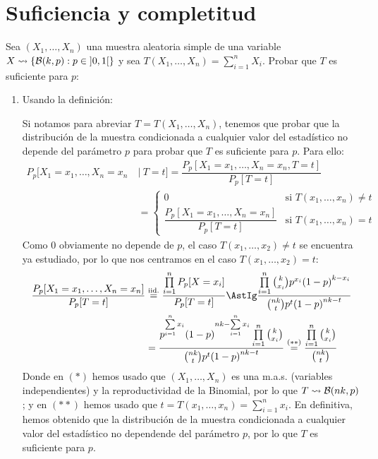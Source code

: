 \section{Suficiencia y completitud}

\begin{ejercicio}
    Sea $(X_1, \ldots, X_n)$ una muestra aleatoria simple de una variable $X\rightsquigarrow\{\mathcal{B}(k,p) : p\in \left]0,1\right[\}$ y sea $T(X_1, \ldots, X_n) = \sum\limits_{i=1}^n X_i$. Probar que $T$ es suficiente para $p$:
    \begin{enumerate}
        \item Usando la definición:
        
        Si notamos para abreviar $T=T(X_1, \ldots, X_n)$, tenemos que probar que la distribución de la muestra condicionada a cualquier valor del estadístico no depende del parámetro $p$ para probar que $T$ es suficiente para $p$. Para ello:
        \begin{align*}
            P_p[X_1 = x_1, \ldots, X_n = x_n \ &|\ T=t] = \dfrac{P_p[X_1=x_1, \ldots, X_n = x_n, T=t]}{P_p[T=t]} \\
                                                        &= \left\{\begin{array}{ll}
                                                            0 & \text{si\ } T(x_1,\ldots,x_n)\neq t \\
                                                            \dfrac{P_p[X_1=x_1, \ldots, X_n=x_n]}{P_p[T=t]}& \text{si\ } T(x_1,\ldots,x_n) = t
                                                        \end{array}\right. 
        \end{align*}
        Como $0$ obviamente no depende de $p$, el caso $T(x_1,\ldots,x_2)\neq t$ se encuentra ya estudiado, por lo que nos centramos en el caso $T(x_1,\ldots,x_2)=t$:
        \begin{align*}
            \dfrac{P_p[X_1=x_1, \ldots, X_n = x_n]}{P_p[T=t]} &\stackrel{\text{iid.}}{=} \dfrac{\prod\limits_{i=1}^{n}P_p[X=x_i]}{P_p[T=t]} \AstIg \dfrac{\prod\limits_{i=1}^n \binom{k}{x_i} p^{x_i} {(1-p)}^{k-x_i}}{\binom{nk}{t}p^t{(1-p)}^{nk-t}} \\
                                                                &= \dfrac{p^{\sum\limits_{i=1}^n x_i} {(1-p)}^{nk - \sum\limits_{i=1}^n x_i}\prod\limits_{i=1}^n \binom{k}{x_i}}{\binom{nk}{t}p^t{(1-p)}^{nk-t}} \stackrel{(\ast\ast)}{=} \dfrac{\prod\limits_{i=1}^{n}\binom{k}{x_i}}{\binom{nk}{t}}
        \end{align*}
        Donde en $(\ast)$ hemos usado que $(X_1, \ldots, X_n)$ es una m.a.s. (variables independientes) y la reproductividad de la Binomial, por lo que $T\rightsquigarrow \mathcal{B}(nk,p)$; y en $(\ast\ast)$ hemos usado que $t=T(x_1, \ldots, x_n) = \sum\limits_{i=1}^{n}x_i$. En definitiva, hemos obtenido que la distribución de la muestra condicionada a cualquier valor del estadístico no dependende del parámetro $p$, por lo que $T$ es suficiente para $p$.
    

\end{enumerate}
\end{ejercicio}
